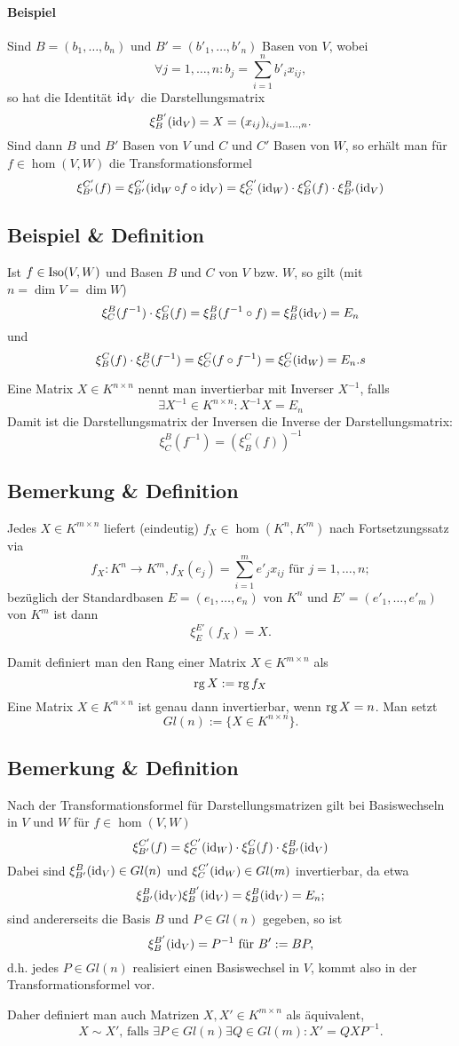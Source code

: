 \paragraph{Beispiel}
	Sind $ B=(b_1,\dots,b_n) $ und $ B'=(b'_1,\dots,b'_n) $ Basen von $ V $, wobei
		\[ \forall j=1,\dots,n:b_j = \sum_{i=1}^{n}b'_ix_{ij}, \]
	so hat die Identität $ \operatorname{id}_V $ die Darstellungsmatrix
		\[ \xi_B^{B'}(\operatorname{id}_V)= X = (x_{ij})_{i,j=1\dots,n}. \]
	Sind dann $ B $ und $ B' $ Basen von $ V $ und $ C $ und $ C' $ Basen von $ W $, so erhält man für $ f\in\hom(V,W) $ die Transformationsformel
		\[ \xi_{B'}^{C'}(f) = \xi_{B'}^{C'}(\operatorname{id}_W\circ f\circ \operatorname{id}_V) = \xi_C^{C'}(\operatorname{id}_W)\cdot \xi_B^C(f)\cdot \xi_{B'}^{B}(\operatorname{id}_V) \]
\subsection{Beispiel \& Definition}
	Ist $ f\in \operatorname{Iso}(V,W) $ und Basen $ B $ und $ C $ von $ V $ bzw. $ W $, so gilt (mit $ n=\dim V = \dim W $)
		\[ \xi_C^B(f^{-1})\cdot \xi_B^C(f) = \xi_B^B(f^{-1}\circ f) = \xi_B^B(\operatorname{id}_V) = E_n \]
	und
		\[ \xi_B^C(f)\cdot \xi_C^B(f^{-1})=\xi_C^C(f\circ f^{-1}) = \xi_C^C(\operatorname{id}_W)=E_n.s \]
	\begin{Definition}
	Eine Matrix $ X\in K^{n\times n} $ nennt man invertierbar mit Inverser $ X^{-1} $, falls
		\[ \exists X^{-1}\in K^{n\times n}:X^{-1}X = E_n \]
	Damit ist die Darstellungsmatrix der Inversen die Inverse der Darstellungsmatrix:
		\[ \xi_C^B(f^{-1}) = (\xi_B^C(f))^{-1} \]
	\end{Definition}
\subsection{Bemerkung \& Definition}
	Jedes $ X\in K^{m\times n} $ liefert (eindeutig) $ f_X\in \hom(K^n,K^m) $ nach Fortsetzungssatz via
		\[ f_X:K^n\to K^m, f_X(e_j) = \sum_{i=1}^{m} e'_jx_{ij} \text{ für } j=1,\dots,n; \]
	bezüglich der Standardbasen $ E = (e_1,\dots,e_n) $ von $ K^n $ und $ E'=(e'_1,\dots,e'_m) $ von $ K^m $ ist dann
		\[ \xi_E^{E'}(f_X) = X. \]
	\begin{Definition}
	Damit definiert man den Rang einer Matrix $ X\in K^{m\times n} $ als 
		\[ \operatorname{rg} X:=\operatorname{rg} f_X \]
	Eine Matrix $ X\in K^{n\times n} $ ist genau dann invertierbar, wenn $ \operatorname{rg} X = n $. Man setzt
		\[ Gl(n):= \{X\in K^{n\times n}\}. \]
	\end{Definition}
\subsection{Bemerkung \& Definition}
	Nach der Transformationsformel für Darstellungsmatrizen gilt bei Basiswechseln in $ V $ und $ W $ für $ f\in \hom(V,W) $
		\[ \xi_{B'}^{C'}(f) = \xi_C^{C'}(\operatorname{id}_W)\cdot \xi_B^C(f)\cdot \xi_{B'}^B(\operatorname{id}_V) \]
	Dabei sind $ \xi_{B'}^B(\operatorname{id}_V)\in Gl(n) $ und $ \xi_C^{C'}(\operatorname{id}_W)\in Gl(m) $ invertierbar, da etwa
		\[ \xi^B_{B'}(\operatorname{id}_V)\xi_B^{B'}(\operatorname{id}_V) = \xi_B^B(\operatorname{id}_V)=E_n; \]
	sind andererseits die Basis $ B $ und $ P\in Gl(n) $ gegeben, so ist
		\[ \xi_B^{B'}(\operatorname{id}_V)=P^{-1} \text{ für } B':= BP, \]
	d.h. jedes $ P\in Gl(n) $ realisiert einen Basiswechsel in $ V $, kommt also in der Transformationsformel vor.
	
	\begin{Definition}
	Daher definiert man auch Matrizen $ X,X'\in K^{m\times n} $ als äquivalent,
		\[ X\sim X' \text{, falls }\exists P\in Gl(n)\exists Q\in Gl(m):X' = QXP^{-1}.  \]
	\end{Definition}